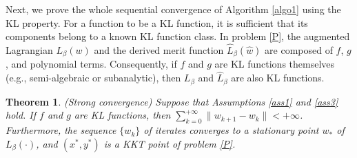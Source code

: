 \documentclass[pdflatex,sn-mathphys-num]{sn-jnl}%
\theoremstyle{thmstyleone}%
\newtheorem{theorem}{Theorem}%
\theoremstyle{thmstyletwo}%
\theoremstyle{thmstylethree}%
\begin{document}
Next, we prove the whole sequential convergence of Algorithm \ref{algo1} using the KL property. For a function to be a KL function, it is sufficient that its components belong to a known KL function class. In problem \eqref{P}, the augmented Lagrangian $L_\beta(w)$ and the derived merit function $\hat{L}_\beta(\hat{w})$ are composed of $f$, $g$, and polynomial terms. Consequently, if $f$ and $g$ are KL functions themselves (e.g., semi-algebraic or subanalytic), then $L_\beta$ and $\hat{L}_\beta$ are also KL functions.

\begin{theorem}\label{the2} (Strong convergence)
Suppose that Assumptions \ref{ass1} and \ref{ass3} hold. If $f$ and $g$ are KL functions, then $\sum_{k=0}^{+\infty} \|{w}_{k+1}-w_{k}\|<+\infty$. Furthermore, the sequence $\{w_k\}$ of iterates converges to a stationary point $w_*$ of $L_{\beta}(\cdot)$, and $(x^*,y^*)$ is a KKT point of problem \eqref{P}.
\end{theorem}
\end{document}
